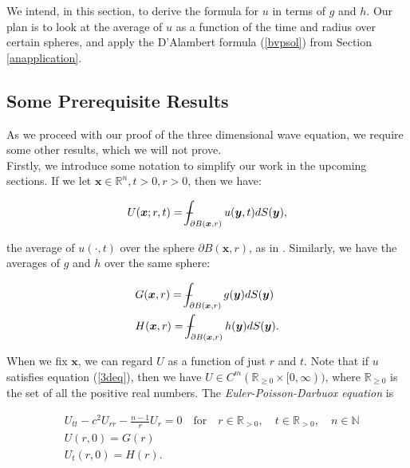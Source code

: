 \documentclass[a4paper, 12pt]{article}
\def\Xint#1{\mathchoice
{\XXint\displaystyle\textstyle{#1}}%
{\XXint\textstyle\scriptstyle{#1}}%
{\XXint\scriptstyle\scriptscriptstyle{#1}}%
{\XXint\scriptscriptstyle\scriptscriptstyle{#1}}%
\!\int}
\def\XXint#1#2#3{{\setbox0=\hbox{$#1{#2#3}{\int}$ }
\vcenter{\hbox{$#2#3$ }}\kern-.6\wd0}}
\def\dashint{\Xint-}
\numberwithin{equation}{section}
\begin{document}
We intend, in this section, to derive the formula for $u$ in terms of $g$ and $h$. Our plan is to look at the average of $u$ as a
function of the time and radius over certain spheres, and apply the D'Alambert formula (\ref{bvpsol}) from Section \ref{anapplication}.

\subsection{Some Prerequisite Results} \label{prereq}
As we proceed with our proof of the three dimensional wave equation, we require some other results, which we will not prove.
\\

Firstly, we introduce some notation to simplify our work in the upcoming sections. If we let $\boldsymbol{x}\in \mathbb{R}^n, t>0, r>0$, then we have:

\begin{equation} \label{averageU}
    U(\boldsymbol{x};r,t)=\dashint_{\partial B(\boldsymbol{x},r)}u(\boldsymbol{y},t)dS(\boldsymbol{y}),
\end{equation}

the average of $u(\cdot,t)$ over the sphere $\partial B(\boldsymbol{x},r)$, as in \cite{Ev}. Similarly, we have the averages of $g$ and $h$ over the same sphere:

\begin{equation} \label{averageGH}
    \begin{aligned}
        &G(\boldsymbol{x},r)=\dashint_{\partial B(\boldsymbol{x},r)}g(\boldsymbol{y})dS(\boldsymbol{y})\\
        &H(\boldsymbol{x},r)=\dashint_{\partial B(\boldsymbol{x},r)}h(\boldsymbol{y})dS(\boldsymbol{y}).
    \end{aligned}
\end{equation}

When we fix $\boldsymbol{x}$, we can regard $U$ as a function of just $r$ and $t$. Note that if $u$ satisfies equation
(\ref{3deq}), then we have $U \in C^m(\mathbb{R}_{\ge 0}\times[0,\infty))$, where $\mathbb{R}_{\ge 0}$ is the set of all the positive real numbers. The \emph{Euler-Poisson-Darbuox equation} is

\begin{equation} \label{EPDeq}
    \begin{aligned}
        &U_{tt}-c^2U_{rr}-\frac{n-1}{r}U_r=0 \quad \textrm {for} \quad r \in \mathbb{R}_{>0}, \quad t \in \mathbb{R}_{>0}, \quad n \in \mathbb{N}\\
        &U(r, 0)=G(r)\\
        &U_t(r,0)=H(r).
    \end{aligned}
\end{equation}
\end{document}
